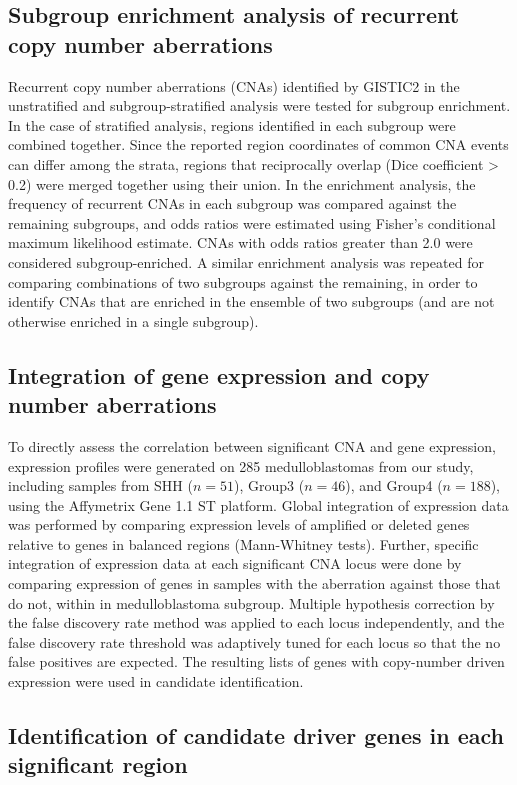 \subsection{Subgroup enrichment analysis of recurrent copy number aberrations}

Recurrent copy number aberrations (CNAs) identified by GISTIC2 in the unstratified and subgroup-stratified analysis were tested for subgroup enrichment. In the case of stratified analysis, regions identified in each subgroup were combined together. Since the reported region coordinates of common CNA events can differ among the strata, regions that reciprocally overlap (Dice coefficient > 0.2) were merged together using their union. In the enrichment analysis, the frequency of recurrent CNAs in each subgroup was compared against the remaining subgroups, and odds ratios were estimated using Fisher’s conditional maximum likelihood estimate. CNAs with odds ratios greater than 2.0 were considered subgroup-enriched. A similar enrichment analysis was repeated for comparing combinations of two subgroups against the remaining, in order to identify CNAs that are enriched in the ensemble of two subgroups (and are not otherwise enriched in a single subgroup).

\subsection{Integration of gene expression and copy number aberrations}

To directly assess the correlation between significant CNA and gene expression, expression profiles were generated on 285 medulloblastomas from our study, including samples from SHH ($n = 51$), Group3 ($n = 46$), and Group4 ($n = 188$), using the Affymetrix Gene 1.1 ST platform. Global integration of expression data was performed by comparing expression levels of amplified or deleted genes relative to genes in balanced regions (Mann-Whitney tests). Further, specific integration of expression data at each significant CNA locus were done by comparing expression of genes in samples with the aberration against those that do not, within in medulloblastoma subgroup. Multiple hypothesis correction by the false discovery rate method was applied to each locus independently, and the false discovery rate threshold was adaptively tuned for each locus so that the no false positives are expected. The resulting lists of genes with copy-number driven expression were used in candidate identification.

\subsection{Identification of candidate driver genes in each significant region}

